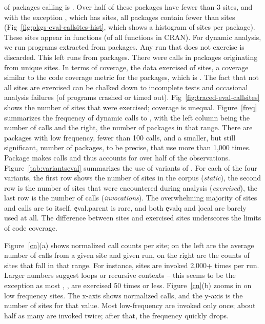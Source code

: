 \documentclass[review,screen,acmsmall,anonymous=true]{acmart}
\begin{document}
of packages calling \eval is \PkgPackagesRatio. Over half of these packages
have fewer than 3 sites, and with the exception \MaxEvalCallSitesPackage, which
has \MaxEvalCallSitesCount sites, all packages contain fewer than
\MaxEvalCallSitesRest sites (\cf Fig~\ref{fig:pkgs-eval-callsites-hist}, which
shows a histogram of sites per package). These sites appear in \PkgFunsWithEval
functions (\CranFunsWithEvalRatio of all functions in CRAN).
For dynamic analysis, we run \CranRunnableScripts programs extracted from
\CranPackages packages. Any run that does not exercise \eval is discarded. This
left \packageNbruns runs from \packageCorpus packages. There were
\packageAllcalls calls in \packageTriggeredpkgs packages originating from
\PkgHitEvalCallSites unique sites. In terms of coverage, the data exercised
\PkgHitEvalCallSitesAvgRatio of sites, a coverage similar to the code coverage
metric for the packages, which is \PkgCodeCoverage. The fact that not all sites
are exercised can be chalked down to incomplete tests and occasional analysis
failures (\PkgFailedProgramsRatio of programs crashed or timed out).
Fig~\ref{fig:traced-eval-callsites} shows the number of sites that were
exercised; coverage is unequal. Figure~\ref{freq} summarizes the frequency of
dynamic calls to \eval, with the left
column being the number of calls and the right, the number of packages in that
range. There are \packageFewcalls packages with low \eval frequency, fewer than
100 calls, and a smaller, but still significant, number of packages,
\packageManycalls to be precise, that use \eval more than 1,000 times. Package
\packageMaxcallspack makes \packageMaxcalls calls and thus accounts for over
half of the observations. Figure~\ref{tab:variantseval} summarizes the use of
variants of \eval. For each of the four variants, the first row shows the number
of sites in the corpus (\emph{static}), the second row is the number of sites
that were encountered during analysis (\emph{exercised}), the last row is the
number of calls (\emph{invocations}). The overwhelming majority of sites and
calls are to \eval itself, \c{eval.parent} is rare, and both \c{evalq} and
\c{local} are barely used at all. The difference between sites and exercised
sites underscores the limits of code coverage.


Figure~\ref{cn}(a) shows normalized call counts per site; on the left are
the average number of calls from a given site and given run, on the right are the counts of sites that fall in that range. For instance, \packageRunbinh sites are
invoked 2,000+ times per run. Larger numbers suggest loops or recursive contexts
-- this seems to be the exception as most \evals, \packageRunbina, are exercised
50 times or less. Figure~\ref{cn}(b) zooms in on low frequency sites. The x-axis
shows normalized calls, and the y-axis is the number of sites for that value. Most
low-frequency \evals are invoked only once; about half as many are invoked
twice; after that, the frequency quickly drops.
\end{document}
